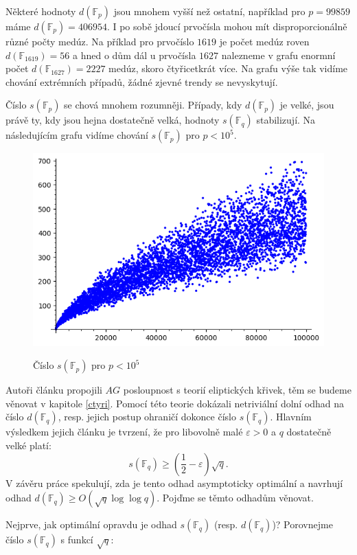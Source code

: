 \documentclass[12pt]{report}
\begin{document}
Některé hodnoty $d(\mathbb{F}_p)$ jsou mnohem vyšší než ostatní, například pro $p=99859$ máme $d(\mathbb{F}_p) = 406954$. I po sobě jdoucí prvočísla mohou mít disproporcionálně různé počty medúz. Na příklad pro prvočíslo $1619$ je počet medúz roven $d(\mathbb{F}_{1619}) = 56$ a hned o dům dál u prvočísla $1627$ nalezneme v grafu enormní počet $d(\mathbb{F}_{1627}) =2227$ medúz, skoro čtyřicetkrát více. Na grafu výše tak vidíme chování extrémních případů, žádné zjevné trendy se nevyskytují. 

Číslo $s(\mathbb{F}_p)$ se chová mnohem rozumněji. Případy, kdy $d(\mathbb{F}_p)$ je velké, jsou právě ty, kdy jsou hejna dostatečně velká, hodnoty $s(\mathbb{F}_q)$ stabilizují. Na následujícím grafu vidíme chování $s(\mathbb{F}_p)$ pro $p<10^5$.\\

\begin{figure}[h]
\centering
  \includegraphics[width=12cm]{SCount.png}
  \label{fig:boat1}
  \caption{Číslo $s(\mathbb{F}_p)$ pro $p < 10^5$}
\end{figure}


Autoři článku \cite{Meduza} propojili $AG$ posloupnost s teorií eliptických křivek, těm se budeme věnovat v kapitole \ref{ctyri}. Pomocí této teorie dokázali netriviální dolní odhad na číslo $d(\mathbb{F}_q)$, resp. jejich postup ohraničí dokonce číslo $s(\mathbb{F}_q)$. Hlavním výsledkem jejich článku je tvrzení, že pro libovolně malé $\varepsilon > 0$ a $q$ dostatečně velké platí:
$$s(\mathbb{F}_q) \geqslant \left( \frac{1}{2} - \varepsilon \right) \sqrt{q}.$$
V závěru práce spekulují, zda je tento odhad asymptoticky optimální a navrhují odhad $d(\mathbb{F}_q) \geqslant O(\sqrt{q} \log \log q)$. Pojďme se těmto odhadům věnovat.

Nejprve, jak optimální opravdu je odhad $s(\mathbb{F}_q)$ (resp. $d(\mathbb{F}_q)$)?  Porovnejme číslo $s(\mathbb{F}_q)$ s funkcí $ \sqrt{q}$:
\end{document}
